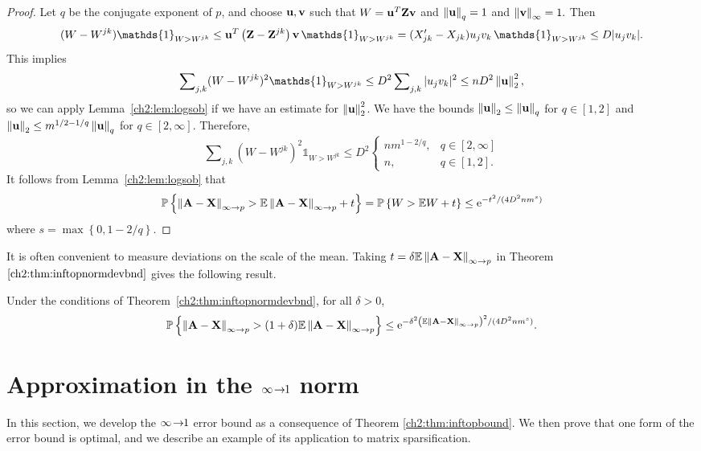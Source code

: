 \begin{proof}
Let $q$ be the conjugate exponent of $p$, and choose $\mathbf{u},\mathbf{v}$ such that
$W=\mathbf{u}^{T}\mathbf{Z}\mathbf{v}$ and $\left\|\mathbf{u}\right\|_q = 1$ and
$\left\|\mathbf{v}\right\|_\infty = 1.$ Then 
\[
(W-W^{jk})\mathds{1}_{W>W^{jk}}\leq\mat{u}^{T}\left(\mat{Z}-\mat{Z}^{jk}
\right)\mat{v}\,\mathds{1}_{W>W^{jk}}=(X_{jk}^{\prime}-X_{jk})u_{j}v_{k}\,
\mathds{1}_{W>W^{jk}}\leq D|u_{j}v_{k}|.
\]
This implies 
\[
\sum\nolimits_{j,k}(W-W^{jk})^{2}\mathds{1}_{W>W^{jk}}\leq
D^{2}\sum\nolimits_{j,k}|u_{j}v_{k}|^{2}\leq nD^{2}\norm{\mat{u}}_{2}^{2},
\]
so we can apply Lemma~\ref{ch2:lem:logsob} if we have an estimate for
$\left\|\mathbf{u}\right\|_2^2$. We have the bounds
$\left\|\mathbf{u}\right\|_{2}\leq\left\|\mathbf{u}\right\|_{q}$ for $q\in[1,2]$ and
$\left\|\mathbf{u}\right\|_{2}\leq m^{1/2-1/q}\left\|\mathbf{u}\right\|_{q}$ for $q\in[2,\infty]$.
Therefore,
\[
\sum\nolimits_{j,k}(W-W^{jk})^{2}\mathds{1}_{W>W^{jk}}\leq D^{2}
\begin{cases}
nm^{1-2/q}, & q\in[2,\infty]\\
n, & q\in[1,2].
\end{cases}
\]
It follows from Lemma~\ref{ch2:lem:logsob} that 
\[
\mathbb{P}\left\{\left\|\mathbf{A}-\mathbf{X}\right\|_{\infty\rightarrow p}>\mathbb{E}\left\|\mathbf{A} -
\mathbf{X}\right\|_{\infty\rightarrow p}+t\right\}= \mathbb{P}\left\{W>\mathbb{E} W+t\right\}\leq
\mathrm{e}^{-t^{2}/(4D^{2}nm^{s})}
\]
where $s=\max\left\{0,1-2/q\right\}.$
\end{proof}
It is often convenient to measure deviations on the scale of the mean. Taking
$t=\delta \mathbb{E}\left\|\mathbf{A} - \mathbf{X}\right\|_{\infty \rightarrow p}$ in Theorem
$\ref{ch2:thm:inftopnormdevbnd}$ gives the following result.
\begin{cor}
Under the conditions of Theorem~\ref{ch2:thm:inftopnormdevbnd}, for all $\delta>0$, 
\[
\mathbb{P}\left\{\left\|\mathbf{A}-\mathbf{X}\right\|_{\infty \rightarrow p}>(1 + \delta)\mathbb{E}\left\|\mathbf{A}
- \mathbf{X}\right\|_{\infty \rightarrow p}\right\}\leq \mathrm{e}^{-\delta^{2}\left(\mathbb{E}\left\|\mathbf{A} -
\mathbf{X}\right\|_{\infty \rightarrow p}\right)^{2}/(4D^{2}nm^{s})}.
\]
\label{ch2:cor:inftopreldevbnd}
\end{cor}

\section{Approximation in the $\infty\!\rightarrow\!\!1$ norm}

\label{ch2:sec:inf1norm}

In this section, we develop the $\infty\!\rightarrow\!\!1$ error bound as a consequence of
Theorem \ref{ch2:thm:inftopbound}. We then prove that one form of the error bound is
optimal, and we describe an example of its application to matrix sparsification.


